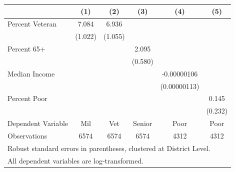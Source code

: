 \begin{tabular}{l*{5}{c}}
\toprule
                    &\multicolumn{1}{c}{(1)}&\multicolumn{1}{c}{(2)}&\multicolumn{1}{c}{(3)}&\multicolumn{1}{c}{(4)}&\multicolumn{1}{c}{(5)}\\
\midrule
Percent Veteran     &       7.084&       6.936&            &            &            \\
                    &     (1.022)&     (1.055)&            &            &            \\
Percent 65+         &            &            &       2.095&            &            \\
                    &            &            &     (0.580)&            &            \\
Median Income       &            &            &            & -0.00000106&            \\
                    &            &            &            &(0.00000113)&            \\
Percent Poor        &            &            &            &            &       0.145\\
                    &            &            &            &            &     (0.232)\\
\midrule
Dependent Variable  &         Mil&         Vet&      Senior&        Poor&        Poor\\
Observations        &        6574&        6574&        6574&        4312&        4312\\
\bottomrule
\multicolumn{6}{l}{\footnotesize Robust standard errors in parentheses, clustered at District Level. }\\
\multicolumn{6}{l}{\footnotesize  All dependent variables are log-transformed.}\\
\end{tabular}

